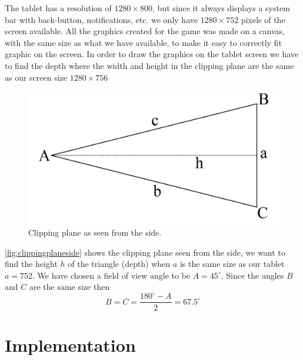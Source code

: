 The tablet has a resolution of $1280 \times 800$, but since it always displays a system bar with back-button, notifications, etc. we only have $1280 \times 752$ pixels of the screen available. All the graphics created for the game was made on a canvas, with the same size as what we have available, to make it easy to correctly fit graphic on the screen. In order to draw the graphics on the tablet screen we have to find the depth where the width and height in the clipping plane are the same as our screen size $1280 \times 756$
\begin{figure}[H]
\centering
\includegraphics[width=0.5\linewidth]{img/trekant.png}
\caption{Clipping plane as seen from the side.}
\label{fig:clippingplaneside}
\end{figure}
\autoref{fig:clippingplaneside} shows the clipping plane seen from the side, we want to find the height $h$ of the triangle (depth) when $a$ is the same size as our tablet $a = 752$. We have chosen a field of view angle to be $A = 45^{\circ}$. Since the angles $B$ and $C$ are the same size then
$$B = C = \frac{180^{\circ} - A}{2} = 67.5^{\circ}$$
\section{Implementation}

